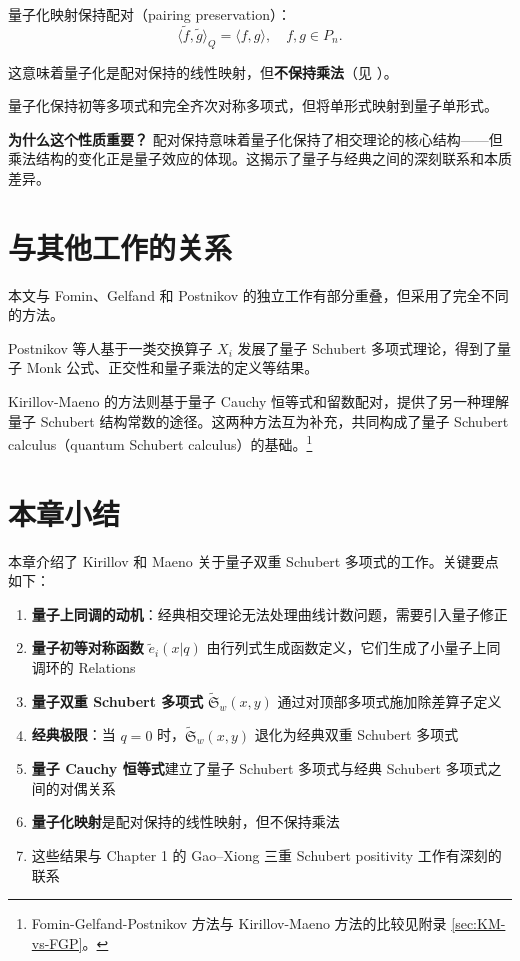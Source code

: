 \begin{Proposition}
\label{prop:PairingPreservation}
量子化映射保持配对（pairing preservation）：
\[
\langle \widetilde{f}, \widetilde{g} \rangle_Q = \langle f, g \rangle, \quad f, g \in P_n.
\label{eq:PairingPreservation}
\]
\end{Proposition}

这意味着量子化是配对保持的线性映射，但\textbf{不保持乘法}（见 \cite[ Remark 5(i)]{KM}）。

量子化保持初等多项式和完全齐次对称多项式，但将单形式映射到量子单形式。

\textbf{为什么这个性质重要？} 配对保持意味着量子化保持了相交理论的核心结构——但乘法结构的变化正是量子效应的体现。这揭示了量子与经典之间的深刻联系和本质差异。

\section{与其他工作的关系}
\label{sec:RelationOtherWork}

本文与 Fomin、Gelfand 和 Postnikov 的独立工作有部分重叠，但采用了完全不同的方法。

Postnikov 等人基于一类交换算子 $X_i$ 发展了量子 Schubert 多项式理论，得到了量子 Monk 公式、正交性和量子乘法的定义等结果。

Kirillov-Maeno 的方法则基于量子 Cauchy 恒等式和留数配对，提供了另一种理解量子 Schubert 结构常数的途径。这两种方法互为补充，共同构成了量子 Schubert calculus（quantum Schubert calculus）的基础。\footnote{Fomin-Gelfand-Postnikov 方法与 Kirillov-Maeno 方法的比较见附录 \cref{sec:KM-vs-FGP}。}

\section{本章小结}
\label{sec:Chapter3Summary}

本章介绍了 Kirillov 和 Maeno 关于量子双重 Schubert 多项式的工作。关键要点如下：

\begin{enumerate}
\item \textbf{量子上同调的动机}：经典相交理论无法处理曲线计数问题，需要引入量子修正
\item \textbf{量子初等对称函数} $\widetilde{e}_i(x|q)$ 由行列式生成函数定义，它们生成了小量子上同调环的 Relations
\item \textbf{量子双重 Schubert 多项式} $\widetilde{\mathfrak{S}}_w(x,y)$ 通过对顶部多项式施加除差算子定义
\item \textbf{经典极限}：当 $q=0$ 时，$\widetilde{\mathfrak{S}}_w(x,y)$ 退化为经典双重 Schubert 多项式
\item \textbf{量子 Cauchy 恒等式}建立了量子 Schubert 多项式与经典 Schubert 多项式之间的对偶关系
\item \textbf{量子化映射}是配对保持的线性映射，但不保持乘法
\item 这些结果与 Chapter 1 的 Gao--Xiong \cite{GX2025} 三重 Schubert positivity 工作有深刻的联系
\end{enumerate}

